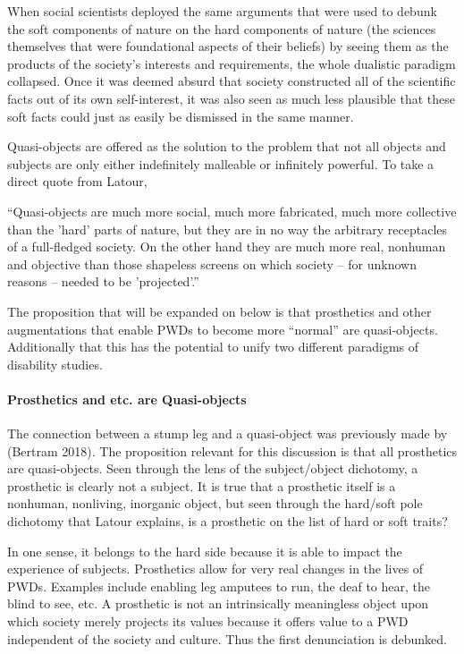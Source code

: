 \documentclass[a4paper]{article}
\begin{document}
When social scientists deployed the same arguments that were used to debunk
the soft components of nature on the hard components of nature (the sciences
themselves that were foundational aspects of their beliefs) by seeing them as
the products of the society's interests and requirements, the whole dualistic
paradigm collapsed. Once it was deemed absurd that society constructed all of
the scientific facts out of its own self-interest, it was also seen as much
less plausible that these soft facts could just as easily be dismissed in the
same manner.

Quasi-objects are offered as the solution to the problem that not all objects
and subjects are only either indefinitely malleable or infinitely powerful. To
take a direct quote from Latour,

``Quasi-objects are much more social, much more fabricated, much more
collective than the 'hard' parts of nature, but they are in no way the
arbitrary receptacles of a full-fledged society. On the other hand they are
much more real, nonhuman and objective than those shapeless screens on which
society – for unknown reasons – needed to be 'projected'.''

The proposition that will be expanded on below is that prosthetics and other
augmentations that enable PWDs to become more ``normal'' are quasi-objects.
Additionally that this has the potential to unify two different paradigms of
disability studies. 


\paragraph{Prosthetics and etc. are Quasi-objects}

The connection between a stump leg and a quasi-object was previously made by
(Bertram 2018). The proposition relevant for this discussion is that all
prosthetics are quasi-objects. Seen through the lens of the subject/object
dichotomy, a prosthetic is clearly not a subject. It is true that a prosthetic
itself is a nonhuman, nonliving, inorganic object, but seen through the
hard/soft pole dichotomy that Latour explains, is a prosthetic on the list of
hard or soft traits? 

In one sense, it belongs to the hard side because it is able to impact the
experience of subjects. Prosthetics allow for very real changes in the lives
of PWDs. Examples include enabling leg amputees to run, the deaf to hear, the
blind to see, etc. A prosthetic is not an intrinsically meaningless object
upon which society merely projects its values because it offers value to a PWD
independent of the society and culture. Thus the first denunciation is
debunked.
\end{document}

